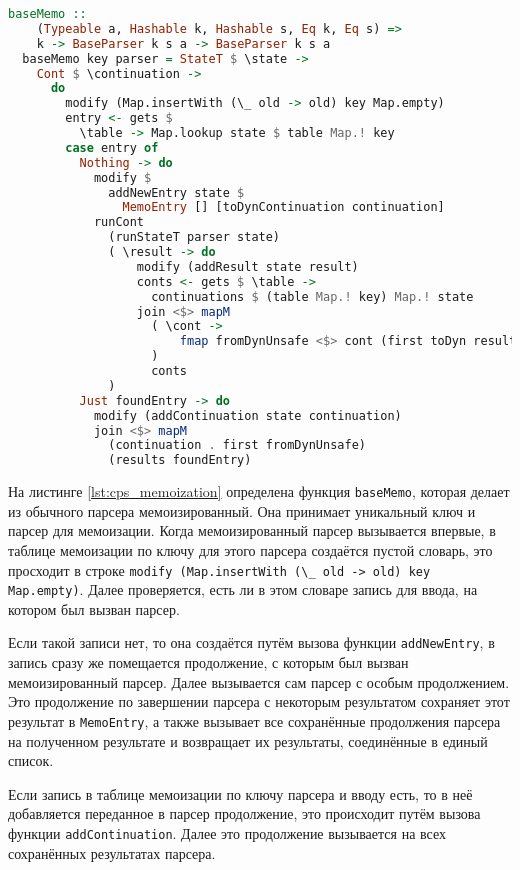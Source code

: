 \documentclass[times]{itmo-student-thesis}
\begin{document}
\begin{lstlisting}[language=Haskell,float=!h,caption={Мемоизация для CPS парсера},label={lst:cps_memoization}]
  baseMemo ::
    (Typeable a, Hashable k, Hashable s, Eq k, Eq s) =>
    k -> BaseParser k s a -> BaseParser k s a
  baseMemo key parser = StateT $ \state ->
    Cont $ \continuation ->
      do
        modify (Map.insertWith (\_ old -> old) key Map.empty)
        entry <- gets $
          \table -> Map.lookup state $ table Map.! key
        case entry of
          Nothing -> do
            modify $
              addNewEntry state $
                MemoEntry [] [toDynContinuation continuation]
            runCont
              (runStateT parser state)
              ( \result -> do
                  modify (addResult state result)
                  conts <- gets $ \table ->
                    continuations $ (table Map.! key) Map.! state
                  join <$> mapM
                    ( \cont ->
                        fmap fromDynUnsafe <$> cont (first toDyn result)
                    )
                    conts
              )
          Just foundEntry -> do
            modify (addContinuation state continuation)
            join <$> mapM
              (continuation . first fromDynUnsafe)
              (results foundEntry)
\end{lstlisting}

На листинге \ref{lst:cps_memoization} определена функция \lstinline{baseMemo}, которая делает из обычного парсера
мемоизированный. Она принимает уникальный ключ и парсер  для мемоизации. Когда мемоизированный парсер вызывается
впервые, в таблице мемоизации по ключу для этого парсера создаётся пустой словарь, это просходит в строке
\lstinline{modify (Map.insertWith (\_ old -> old) key Map.empty)}. Далее проверяется, есть ли в этом словаре запись для 
ввода, на котором был вызван парсер.

Если такой записи нет, то она создаётся путём вызова функции \lstinline{addNewEntry}, в запись сразу же помещается продолжение, с
которым был вызван мемоизированный парсер. Далее вызывается сам парсер с особым продолжением. Это продолжение
по завершении парсера с некоторым результатом сохраняет этот результат в \lstinline{MemoEntry}, а также вызывает все
сохранённые продолжения парсера на полученном результате и возвращает их результаты, соединённые в единый список.

Если запись в таблице мемоизации по ключу парсера и вводу есть, то в неё добавляется переданное в парсер продолжение, это происходит
путём вызова функции \lstinline{addContinuation}. Далее это продолжение вызывается на всех сохранённых результатах парсера.
\end{document}
